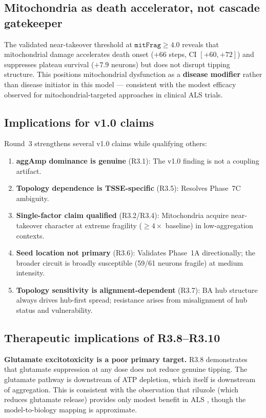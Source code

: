 \documentclass[12pt,a4paper]{article}
\begin{document}
\subsection{Mitochondria as death accelerator, not cascade gatekeeper}

The validated near-takeover threshold at $\texttt{mitFrag} \geq 4.0$ reveals that mitochondrial
damage accelerates death onset ($+66$ steps, CI $[+60, +72]$) and suppresses plateau survival
($+7.9$ neurons) but does not disrupt tipping structure. This positions mitochondrial
dysfunction as a \textbf{disease modifier} rather than disease initiator in this model ---
consistent with the modest efficacy observed for mitochondrial-targeted approaches in clinical
ALS trials.

\subsection{Implications for v1.0 claims}

Round~3 strengthens several v1.0 claims while qualifying others:

\begin{enumerate}
\item \textbf{aggAmp dominance is genuine} (R3.1): The v1.0 finding is not a coupling artifact.
\item \textbf{Topology dependence is TSSE-specific} (R3.5): Resolves Phase~7C ambiguity.
\item \textbf{Single-factor claim qualified} (R3.2/R3.4): Mitochondria acquire near-takeover
      character at extreme fragility ($\geq 4\times$ baseline) in low-aggregation contexts.
\item \textbf{Seed location not primary} (R3.6): Validates Phase~1A directionally; the broader
      circuit is broadly susceptible (59/61 neurons fragile) at medium intensity.
\item \textbf{Topology sensitivity is alignment-dependent} (R3.7): BA hub structure always
      drives hub-first spread; resistance arises from misalignment of hub status and vulnerability.
\end{enumerate}

\subsection{Therapeutic implications of R3.8--R3.10}

\textbf{Glutamate excitotoxicity is a poor primary target.} R3.8 demonstrates that glutamate
suppression at any dose does not reduce genuine tipping. The glutamate pathway is downstream of
ATP depletion, which itself is downstream of aggregation. This is consistent with the observation
that riluzole (which reduces glutamate release) provides only modest benefit in ALS
\citep{benatar2023}, though the model-to-biology mapping is approximate.
\end{document}
